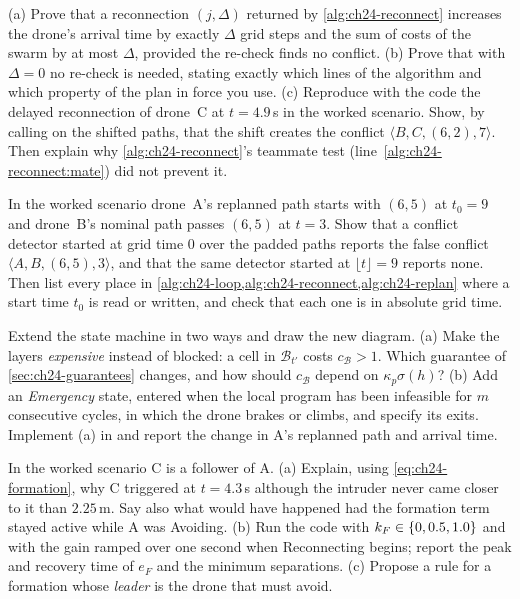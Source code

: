 \begin{exercise}[\difficulty{2}]
\label{exr:ch24-reconnect-bound}
(a) Prove that a reconnection $(j, \Delta)$ returned by
\cref{alg:ch24-reconnect} increases the drone's arrival time by exactly
$\Delta$ grid steps and the sum of costs of the swarm by at most $\Delta$,
provided the re-check finds no conflict. (b) Prove that with $\Delta = 0$ no
re-check is needed, stating exactly which lines of the algorithm and which
property of the plan in force you use. (c) Reproduce with the code the
delayed reconnection of drone~C at $t = 4.9$\,s in the worked scenario.
Show, by calling  on the shifted paths, that the shift
creates the conflict $\langle B, C, (6,2), 7 \rangle$. Then explain why
\cref{alg:ch24-reconnect}'s teammate test (line~\ref{alg:ch24-reconnect:mate})
did not prevent it.
\end{exercise}

\begin{exercise}[\difficulty{1}]
\label{exr:ch24-offsets}
In the worked scenario drone~A's replanned path starts with $(6,5)$ at
$t_0 = 9$ and drone~B's nominal path passes $(6,5)$ at $t = 3$. Show that a
conflict detector started at grid time $0$ over the padded paths reports the
false conflict $\langle A, B, (6,5), 3 \rangle$, and that the same detector
started at $\lfloor t \rfloor = 9$ reports none. Then list every place in
\cref{alg:ch24-loop,alg:ch24-reconnect,alg:ch24-replan} where a start time
$t_0$ is read or written, and check that each one is in absolute grid time.
\end{exercise}

\begin{exercise}[\difficulty{2}]
\label{exr:ch24-states}
Extend the state machine in two ways and draw the new diagram. (a) Make
the layers \emph{expensive} instead of blocked: a cell in $\mathcal{B}_{t'}$
costs $c_{\mathcal{B}} > 1$. Which guarantee of \cref{sec:ch24-guarantees}
changes, and how should $c_{\mathcal{B}}$ depend on $\kappa_p\sigma(h)$?
(b) Add an \emph{Emergency} state, entered when the local program has been
infeasible for $m$ consecutive cycles, in which the drone brakes or climbs,
and specify its exits. Implement (a) in  and report
the change in A's replanned path and arrival time.
\end{exercise}

\begin{exercise}[\difficulty{2}]
\label{exr:ch24-formation}
In the worked scenario C is a follower of A. (a) Explain, using
\cref{eq:ch24-formation}, why C triggered at $t = 4.3$\,s although the
intruder never came closer to it than $2.25$\,m. Say also what would have
happened had the formation term stayed active while A was Avoiding.
(b) Run the code with $k_F \in \left\{ 0, 0.5, 1.0 \right\}$ and with the gain ramped
over one second when Reconnecting begins; report the peak and recovery time
of $e_F$ and the minimum separations. (c) Propose a rule for a formation
whose \emph{leader} is the drone that must avoid.
\end{exercise}

